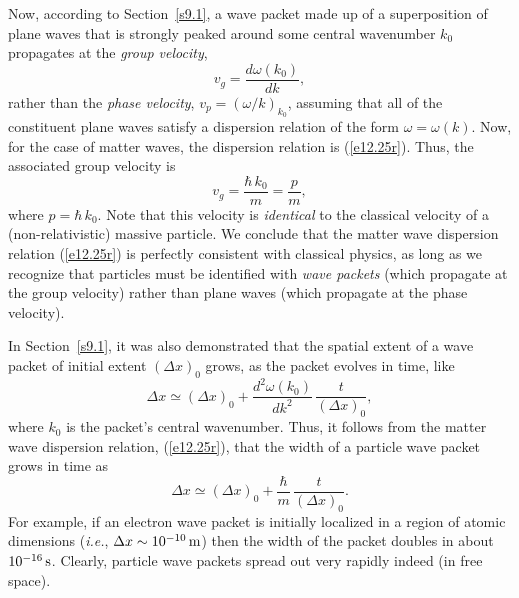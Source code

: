 Now, according to Section~\ref{s9.1}, a wave packet made up of a superposition of
plane waves that is strongly peaked around some
central wavenumber $k_0$ propagates at the {\em group velocity},
\begin{equation}
v_g = \frac{d\omega(k_0)}{dk},
\end{equation}
rather than the {\em phase velocity}, $v_p = (\omega/k)_{k_0}$, 
assuming that all of the constituent plane waves satisfy a dispersion relation of the form $\omega=\omega(k)$. Now,
for the case of matter waves, the dispersion relation is (\ref{e12.25r}). Thus, the associated group velocity is
\begin{equation}
v_g = \frac{\hbar\,k_0}{m} = \frac{p}{m},
\end{equation}
where $p=\hbar\,k_0$. Note that this velocity is {\em identical}\/ to the classical
velocity of a (non-relativistic) massive particle. We conclude that the matter wave dispersion relation (\ref{e12.25r}) is perfectly consistent
with classical physics, as long as we recognize  that particles must be identified with
{\em wave packets}\/ (which propagate at the group velocity) rather than plane waves (which propagate at the phase velocity). 

In Section~\ref{s9.1}, it was also demonstrated that the spatial extent of a  wave packet of initial  extent $(\Delta x)_0$
grows, as the packet evolves in time, like
\begin{equation}
\Delta x \simeq (\Delta x)_0 + \frac{d^2\omega(k_0)}{dk^2}\,\frac{t}{(\Delta x)_0},
\end{equation}
where $k_0$ is the packet's central wavenumber. Thus, it follows from the matter wave dispersion relation, (\ref{e12.25r}), that the
width of a particle wave packet grows in time as
\begin{equation}\label{e12.55}
\Delta x \simeq (\Delta x)_0 + \frac{\hbar}{m}\,\frac{t}{(\Delta x)_0}.
\end{equation}
For example, if an electron wave packet is initially localized in a region of atomic dimensions ({\em i.e.}, $\Delta x\sim 10^{-10}\,{\rm m}$)
then the width of the packet doubles in about $10^{-16}\,{\rm s}$. Clearly, particle
wave packets  spread out very rapidly indeed (in free space).

